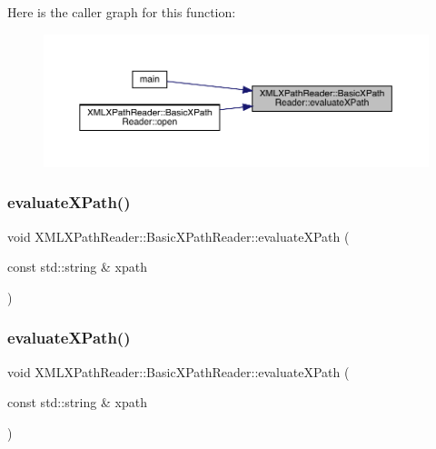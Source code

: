 Here is the caller graph for this function\+:
\nopagebreak
\begin{figure}[H]
\begin{center}
\leavevmode
\includegraphics[width=350pt]{d6/dbf/classXMLXPathReader_1_1BasicXPathReader_a0d2f7c3da72b0669541bef2e1d35f973_icgraph}
\end{center}
\end{figure}
\mbox{\label{classXMLXPathReader_1_1BasicXPathReader_a4aaa7102c9f6a8d5ca3adc574f06ce8b}} 
\subsubsection{\texorpdfstring{evaluateXPath()}{evaluateXPath()}\hspace{0.1cm}{\footnotesize\ttfamily [2/3]}}
{\footnotesize\ttfamily void X\+M\+L\+X\+Path\+Reader\+::\+Basic\+X\+Path\+Reader\+::evaluate\+X\+Path (\begin{DoxyParamCaption}\item[{const std\+::string \&}]{xpath }\end{DoxyParamCaption})}

\mbox{\label{classXMLXPathReader_1_1BasicXPathReader_a4aaa7102c9f6a8d5ca3adc574f06ce8b}} 
\subsubsection{\texorpdfstring{evaluateXPath()}{evaluateXPath()}\hspace{0.1cm}{\footnotesize\ttfamily [3/3]}}
{\footnotesize\ttfamily void X\+M\+L\+X\+Path\+Reader\+::\+Basic\+X\+Path\+Reader\+::evaluate\+X\+Path (\begin{DoxyParamCaption}\item[{const std\+::string \&}]{xpath }\end{DoxyParamCaption})}

